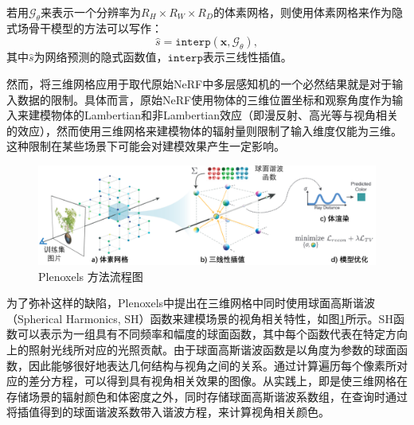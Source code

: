 若用$\mathcal{G}_\theta$来表示一个分辨率为$R_H\times R_W\times R_D$的体素网格，则使用体素网格来作为隐式场骨干模型的方法可以写作：
\begin{equation}
    \hat{s} = \mathtt{interp}(\mathbf{x}, \mathcal{G}_\theta),
\end{equation}
其中$\hat{s}$为网络预测的隐式函数值，$\mathtt{interp}$表示三线性插值。

然而，将三维网格应用于取代原始NeRF中多层感知机的一个必然结果就是对于输入数据的限制。具体而言，原始NeRF使用物体的三维位置坐标和观察角度作为输入来建模物体的Lambertian和非Lambertian效应（即漫反射、高光等与视角相关的效应），然而使用三维网格来建模物体的辐射量则限制了输入维度仅能为三维。这种限制在某些场景下可能会对建模效果产生一定影响。

\begin{figure}[ht]
    \centering
    \includegraphics[width=\textwidth]{undergraduate-thesis/images/related-work/plenoxels.pdf}
    \caption{Plenoxels\cite{fridovich-keil_plenoxels_2022} 方法流程图}
    \label{fig:related-work plenoxels pipeline}
\end{figure}

为了弥补这样的缺陷，Plenoxels\cite{fridovich-keil_plenoxels_2022}中提出在三维网格中同时使用球面高斯谐波（Spherical Harmonics, SH）函数来建模场景的视角相关特性，如图\ref{fig:related-work plenoxels pipeline}所示。SH函数可以表示为一组具有不同频率和幅度的球面函数，其中每个函数代表在特定方向上的照射光线所对应的光照贡献。由于球面高斯谐波函数是以角度为参数的球面函数，因此能够很好地表达几何结构与视角之间的关系。通过计算遍历每个像素所对应的差分方程，可以得到具有视角相关效果的图像。从实践上，即是使三维网格在存储场景的辐射颜色和体密度之外，同时存储球面高斯谐波系数组，在查询时通过将插值得到的球面谐波系数带入谐波方程，来计算视角相关颜色。 


